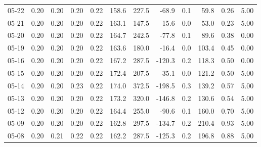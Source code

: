 \begin{threeparttable}
{\begin{tabular}{lrrrrrrrrrrr}
  05-22 &          0.20 &          0.20 &          0.20 &        0.22 &               158.6 &               227.5 &      -68.9 &                 0.1 &             59.8 &            0.26 &                   5.00 \\
  05-21 &          0.20 &          0.20 &          0.20 &        0.22 &               163.1 &               147.5 &       15.6 &                 0.0 &             53.0 &            0.23 &                   5.00 \\
  05-20 &          0.20 &          0.20 &          0.20 &        0.22 &               164.7 &               242.5 &      -77.8 &                 0.1 &             89.6 &            0.38 &                   0.00 \\
  05-19 &          0.20 &          0.20 &          0.20 &        0.22 &               163.6 &               180.0 &      -16.4 &                 0.0 &            103.4 &            0.45 &                   0.00 \\
  05-16 &          0.20 &          0.20 &          0.20 &        0.22 &               167.2 &               287.5 &     -120.3 &                 0.2 &            118.3 &            0.50 &                   0.00 \\
  05-15 &          0.20 &          0.20 &          0.20 &        0.22 &               172.4 &               207.5 &      -35.1 &                 0.0 &            121.2 &            0.50 &                   5.00 \\
  05-14 &          0.20 &          0.20 &          0.23 &        0.22 &               174.0 &               372.5 &     -198.5 &                 0.3 &            139.2 &            0.57 &                   5.00 \\
  05-13 &          0.20 &          0.20 &          0.20 &        0.22 &               173.2 &               320.0 &     -146.8 &                 0.2 &            130.6 &            0.54 &                   5.00 \\
  05-12 &          0.20 &          0.20 &          0.20 &        0.22 &               164.4 &               255.0 &      -90.6 &                 0.1 &            160.0 &            0.70 &                   5.00 \\
  05-09 &          0.20 &          0.20 &          0.20 &        0.22 &               162.8 &               297.5 &     -134.7 &                 0.2 &            210.4 &            0.93 &                   5.00 \\
  05-08 &          0.20 &          0.21 &          0.22 &        0.22 &               162.2 &               287.5 &     -125.3 &                 0.2 &            196.8 &            0.88 &                   5.00 \\

\end{tabular}}
\end{threeparttable}
